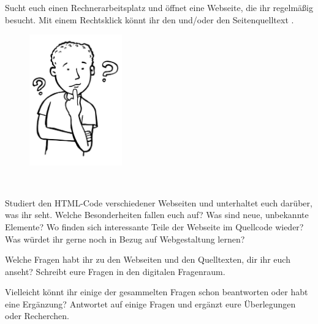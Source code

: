 \documentclass[11pt, a4paper, ngerman]{arbeitsblatt}
\begin{document}
\ReiheTitel

\begin{aufgabe}[subtitle=Websiten untersuchen,icon=\iconPartner\,\iconComputer]
	Sucht euch einen Rechnerarbeitsplatz und öffnet eine Webseite, die ihr regelmäßig besucht. Mit einem Rechtsklick könnt ihr den  und/oder den Seitenquelltext .

	\begin{figure}\centering
		\includegraphics[width=4cm]{9Diff-AB.II.08-Abb_nachdenken.jpg}
	\end{figure} \

	\begin{enuma}
		\item
		Studiert den HTML-Code verschiedener Webseiten und unterhaltet euch darüber, was ihr seht. Welche Besonderheiten fallen euch auf? Was sind neue, unbekannte Elemente? Wo finden sich interessante Teile der Webseite im Quellcode wieder? Was würdet ihr gerne noch in Bezug auf Webgestaltung lernen?

		\item
		Welche Fragen habt ihr zu den Webseiten und den Quelltexten, dir ihr euch anseht? Schreibt eure Fragen in den digitalen Fragenraum.
		\item
		Vielleicht könnt ihr einige der gesammelten Fragen schon beantworten oder habt eine Ergänzung? Antwortet auf einige Fragen und ergänzt eure Überlegungen oder Recherchen.
	\end{enuma}
\end{aufgabe}
\end{document}
